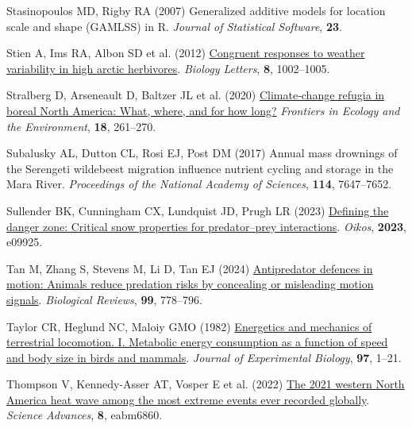 \documentclass[
  12pt,
]{article}
\newlength{\cslhangindent}
\newenvironment{CSLReferences}[2] %
 {\begin{list}{}{%
  \setlength{\itemindent}{0pt}
  \setlength{\leftmargin}{0pt}
  \setlength{\parsep}{0pt}
  \ifodd #1
   \setlength{\leftmargin}{\cslhangindent}
   \setlength{\itemindent}{-1\cslhangindent}
  \fi
  \setlength{\itemsep}{#2\baselineskip}}}
 {\end{list}}
\begin{document}
\begin{CSLReferences}{1}{0}
Stasinopoulos MD, Rigby RA (2007) Generalized additive models for location scale and shape ({GAMLSS}) in {R}. \emph{Journal of Statistical Software}, \textbf{23}.

Stien A, Ims RA, Albon SD et al. (2012) \href{https://doi.org/10.1098/rsbl.2012.0764}{Congruent responses to weather variability in high arctic herbivores}. \emph{Biology Letters}, \textbf{8}, 1002--1005.

Stralberg D, Arseneault D, Baltzer JL et al. (2020) \href{https://doi.org/10.1002/fee.2188}{Climate‐change refugia in boreal {North} {America}: What, where, and for how long?} \emph{Frontiers in Ecology and the Environment}, \textbf{18}, 261--270.

Subalusky AL, Dutton CL, Rosi EJ, Post DM (2017) Annual mass drownings of the {Serengeti} wildebeest migration influence nutrient cycling and storage in the {Mara} {River}. \emph{Proceedings of the National Academy of Sciences}, \textbf{114}, 7647--7652.

Sullender BK, Cunningham CX, Lundquist JD, Prugh LR (2023) \href{https://doi.org/10.1111/oik.09925}{Defining the danger zone: Critical snow properties for predator--prey interactions}. \emph{Oikos}, \textbf{2023}, e09925.

Tan M, Zhang S, Stevens M, Li D, Tan EJ (2024) \href{https://doi.org/10.1111/brv.13044}{Antipredator defences in motion: Animals reduce predation risks by concealing or misleading motion signals}. \emph{Biological Reviews}, \textbf{99}, 778--796.

Taylor CR, Heglund NC, Maloiy GMO (1982) \href{https://doi.org/10.1242/jeb.97.1.1}{Energetics and mechanics of terrestrial locomotion. {I}. {Metabolic} energy consumption as a function of speed and body size in birds and mammals}. \emph{Journal of Experimental Biology}, \textbf{97}, 1--21.

Thompson V, Kennedy-Asser AT, Vosper E et al. (2022) \href{https://doi.org/10.1126/sciadv.abm6860}{The 2021 western {North} {America} heat wave among the most extreme events ever recorded globally}. \emph{Science Advances}, \textbf{8}, eabm6860.


\end{CSLReferences}
\end{document}
